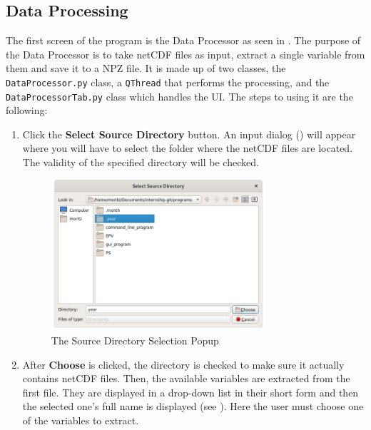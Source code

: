 \documentclass[../00_main.tex]{subfiles}
\begin{document}
\subsection{Data Processing}

The first screen of the program is the Data Processor as seen in .
The purpose of the Data Processor is to take netCDF files as input, extract
a single variable from them and save it to a NPZ file. It is made up of two
classes, the \texttt{DataProcessor.py} class, a \texttt{QThread} that performs the
processing, and the \texttt{DataProcessorTab.py} class which handles the UI. 
The steps to using it are the following:
\begin{enumerate}
    \item Click the \textbf{Select Source Directory} button. An input dialog
        ()
        will appear where you will have to select the folder where the netCDF
        files are located. The validity of the specified directory will be
        checked. 
            \begin{figure}[H]
                \center
                \includegraphics[width=0.75\textwidth]{../graphics/dp02}
                \caption{The Source Directory Selection Popup}
                \label{dp02}
            \end{figure}
    \item After \textbf{Choose} is clicked, the directory is checked to
        make sure it actually contains netCDF files. Then, the available
        variables are extracted from the first file. They are displayed in
        a drop-down list in their short form and then the selected one's
        full name is displayed (see ). Here the user must 
        choose one of the variables to extract. 
        \begin{figure}[H]
            \center

\end{figure}
\end{enumerate}
\end{document}
